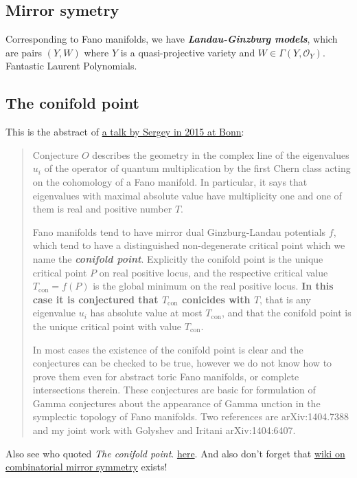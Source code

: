\documentclass{article}
\numberwithin{equation}{section}
\newcommand{\Oc}{\mathcal{O}}
\DeclareMathOperator{\con}{con}
\begin{document}
	\subsection*{Mirror symetry}
	Corresponding to Fano manifolds, we have \textbf{\textit{Landau-Ginzburg models}}, which are pairs $(Y,W)$ where $Y$ is a quasi-projective variety and $W\in\Gamma(Y,\Oc_Y)$. Fantastic Laurent Polynomials.
	
	\subsection{The conifold point}
	This is the abstract of \href{http://www.mpim-bonn.mpg.de/node/5969}{a talk by Sergey in 2015 at Bonn}:
	\begin{quotation}
		Conjecture $O$ describes the geometry in the complex line of the eigenvalues $u_i$ of the operator of quantum multiplication by the first Chern class acting on the cohomology of a Fano manifold. In particular, it says that eigenvalues with maximal absolute value have multiplicity one and one of them is real and positive number $T$.
		
		Fano manifolds tend to have mirror dual Ginzburg-Landau potentials $f$, which
		tend to have a distinguished non-degenerate critical point which we name the
		\textbf{\textit{conifold point}}. Explicitly the conifold point is the unique critical point $P$ on real positive locus, and the respective critical value $T_{\con} = f(P)$ is the global minimum on the real positive locus. \textbf{In this case it is conjectured that $T_{\con}$ conicides with $T$}, that is any eigenvalue $u_i$ has absolute value at most $T_{\con}$, and that the conifold point is the unique critical point with value $T_{\con}$.
		
		In most cases the existence of the conifold point is clear and the conjectures
		can be checked to be true, however we do not know how to prove them even
		for abstract toric Fano manifolds, or complete intersections therein. These conjectures
		are basic for formulation of Gamma conjectures about the appearance of Gamma
		unction in the symplectic topology of Fano manifolds. Two references are arXiv:1404.7388
		and my joint work with Golyshev and Iritani arXiv:1404:6407.
	\end{quotation}
	Also see who quoted \textit{The conifold point}.  \href{https://scholar.google.com/scholar?start=20&hl=es&as_sdt=2005&sciodt=0,5&cites=11808564544162580683&scipsc=}{here}. And also don't forget that \href{https://en.wikipedia.org/wiki/Combinatorial_mirror_symmetry}{wiki on combinatorial mirror symmetry} exists!
	
\end{document}
